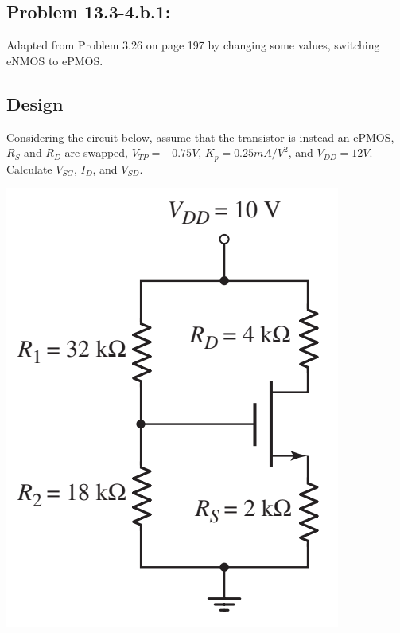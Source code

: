 \documentclass[12pt,letterpaper,titlepage]{article}
\begin{document}
\begin{raggedright}
\clearpage
\section{Problem 13.3-4.b.1: } Adapted from Problem 3.26 on page 197 by changing some values, switching eNMOS to ePMOS.
\subsection{Design}

Considering the circuit below, assume that the transistor is instead an ePMOS, $R_S$ and $R_D$ are swapped, $V_{TP} = -0.75V$, $K_p = 0.25 mA/V^2$, and $V_{DD} = 12V$. Calculate $V_{SG}$, $I_D$, and $V_{SD}$.

\begin{center}
\includegraphics[width=\textwidth, height=12\baselineskip, keepaspectratio=true]{ds2}
\end{center}


\end{raggedright}
\end{document}
